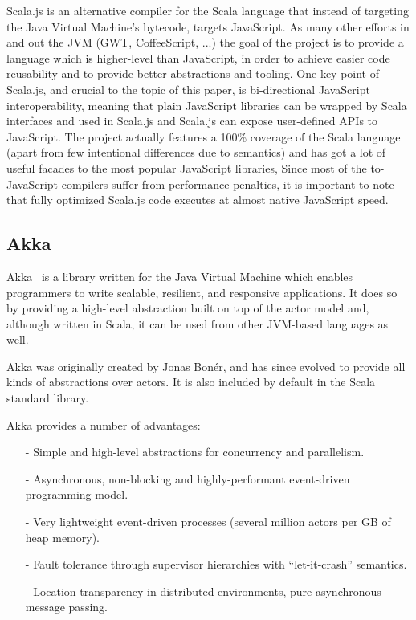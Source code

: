 \documentclass{sig-alternate}
\begin{document}
Scala.js is an alternative compiler for the Scala language that instead of targeting the Java Virtual Machine's bytecode, targets JavaScript.
As many other efforts in and out the JVM (GWT, CoffeeScript, ...) the goal of the project is to provide a language which is higher-level than JavaScript, in order to achieve easier code reusability and to provide better abstractions and tooling.
One key point of Scala.js, and crucial to the topic of this paper, is bi-directional JavaScript interoperability, meaning that plain JavaScript libraries can be wrapped by Scala interfaces and used in Scala.js and Scala.js can expose user-defined APIs to JavaScript.
The project actually features a 100\% coverage of the Scala language  (apart from few intentional differences due to semantics) and has got a lot of useful facades to the most popular JavaScript libraries,
Since most of the to-JavaScript compilers suffer from performance penalties, it is important to note that fully optimized Scala.js code executes at almost native JavaScript speed.


\subsection{Akka}\label{sec:akka}

Akka~\cite{Akka} is a library written for the Java Virtual Machine which enables programmers to write scalable, resilient, and responsive applications. It does so by providing a high-level abstraction built on top of the actor model and, although written in Scala, it can be used from other JVM-based languages as well.

Akka was originally created by Jonas Bon\'{e}r, and has since evolved to provide all kinds of abstractions over actors. It is also included by default in the Scala standard library.

Akka provides a number of advantages:
\begin{itemize}
  \item[-] Simple and high-level abstractions for concurrency and parallelism.
  \item[-] Asynchronous, non-blocking and highly-performant event-driven programming model.
  \item[-] Very lightweight event-driven processes (several million actors per GB of heap memory).
  \item[-] Fault tolerance through supervisor hierarchies with ``let-it-crash'' semantics.
  \item[-] Location transparency in distributed environments, pure asynchronous message passing.
\end{itemize}
\end{document}
